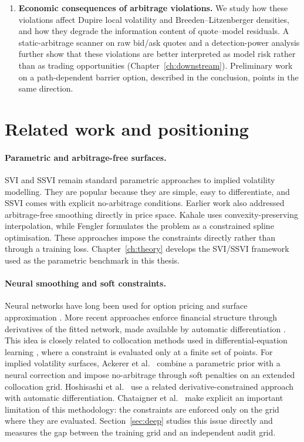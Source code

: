 \begin{enumerate}[label=(\roman*)]
\item \textbf{Economic consequences of arbitrage violations.} We study how these violations affect Dupire local volatility and Breeden--Litzenberger densities, and how they degrade the information content of quote--model residuals. A static-arbitrage scanner on raw bid/ask quotes and a detection-power analysis further show that these violations are better interpreted as model risk rather than as trading opportunities (Chapter~\ref{ch:downstream}). Preliminary work on a path-dependent barrier option, described in the conclusion, points in the same direction.

\end{enumerate}


\section{Related work and positioning}\label{sec:related}
\vspace{+1.0em}
\begingroup
\setlength{\parskip}{-0.9em}

\paragraph{Parametric and arbitrage-free surfaces.}
SVI and SSVI \cite{gatheral2004, gatheraljacquier2014} remain standard parametric approaches to implied volatility modelling. They are popular because they are simple, easy to differentiate, and SSVI comes with explicit no-arbitrage conditions. Earlier work also addressed arbitrage-free smoothing directly in price space. Kahale \cite{kahale2004} uses convexity-preserving interpolation, while Fengler \cite{fengler2009} formulates the problem as a constrained spline optimisation. These approaches impose the constraints directly rather than through a training loss. Chapter~\ref{ch:theory} develops the SVI/SSVI framework used as the parametric benchmark in this thesis.

\paragraph{Neural smoothing and soft constraints.}
Neural networks have long been used for option pricing and surface approximation \cite{hutchinson1994,dugas2001}. More recent approaches enforce financial structure through derivatives of the fitted network, made available by automatic differentiation \cite{baydin2018}. This idea is closely related to collocation methods used in differential-equation learning \cite{lagaris1998,raissi2019}, where a constraint is evaluated only at a finite set of points. For implied volatility surfaces, Ackerer et al.\ \cite{ackerer2020} combine a parametric prior with a neural correction and impose no-arbitrage through soft penalties on an extended collocation grid. Hoshisashi et al.\ \cite{hoshisashi2023} use a related derivative-constrained approach with automatic differentiation. Chataigner et al.\ \cite{chataigner2020} make explicit an important limitation of this methodology: the constraints are enforced only on the grid where they are evaluated. Section~\ref{sec:deep} studies this issue directly and measures the gap between the training grid and an independent audit grid.

